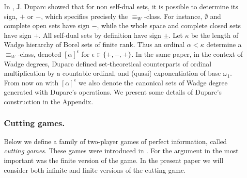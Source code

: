 In \cite{dup1}, J. Duparc showed that for non self-dual sets, it is possible to determine its sign, $+$
or $-$, which specifies precisely the $\equiv_W$-class. 
For instance, $\emptyset$ and complete open sets have sign $-$, while the whole space and complete closed  sets have sign $+$.
  All self-dual sets by
definition have sign $\pm$. Let $\kappa$ be the length of Wadge hierarchy of Borel sets of finite rank. 
Thus an ordinal $\alpha <\kappa$
determine a $\equiv_W$-class, denoted  $[\alpha]^\epsilon$ for $\epsilon\in \{+,-,\pm\}$. %
In the same paper,  in the context of Wadge degrees, Duparc defined  set-theoretical counterparts of ordinal multiplication by a countable ordinal, and (quasi) exponentiation of base $\omega_1$. %
From now on with $[\alpha]^\epsilon$ we also denote the canonical sets of Wadge degree generated with Duparc's operations. We present some details of Duparc's construction in the Appendix. 
\subsubsection*{Cutting games.}
Below we define a family of two-player games of perfect information, called \emph{cutting games}. These games were
introduced in \cite{bp}. For the argument in \cite{bp} the most important was the finite version of the game. In the present paper 
we will consider both infinite and finite versions of the cutting game. %

